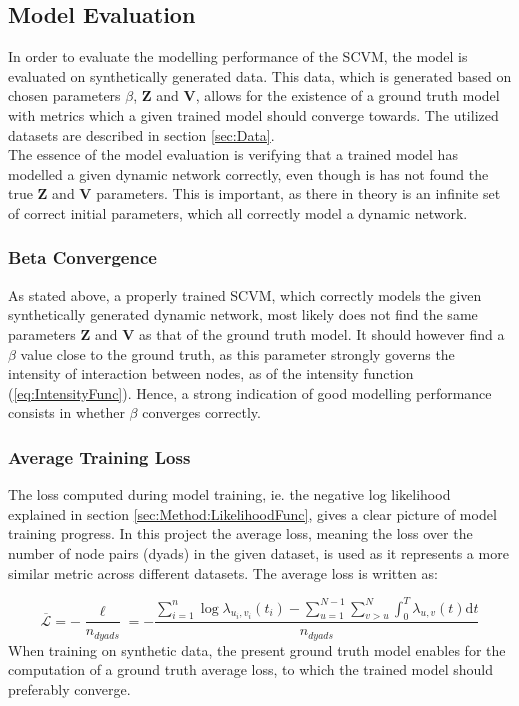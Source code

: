 \subsection{Model Evaluation}
\label{sec:Method:Evaluation}
In order to evaluate the modelling performance of the SCVM, the model is evaluated on synthetically generated data. 
This data, which is generated based on chosen parameters $\beta$, $\textbf{Z}$ and $\textbf{V}$, allows for the existence of a ground truth model with metrics which a given trained model should converge towards. 
The utilized datasets are described in section \ref{sec:Data}.
\\
The essence of the model evaluation is verifying that a trained model has modelled a given dynamic network correctly, even though is has not found the true $\textbf{Z}$ and $\textbf{V}$ parameters.
This is important, as there in theory is an infinite set of correct initial parameters, which all correctly model a dynamic network. 


\subsubsection{Beta Convergence}
\label{sec:Method:Evaluation:BetaConvergence}
As stated above, a properly trained SCVM, which correctly models the given synthetically generated dynamic network, most likely does not find the same parameters $\textbf{Z}$ and $\textbf{V}$ as that of the ground truth model.
It should however find a $\beta$ value close to the ground truth, as this parameter strongly governs the intensity of interaction between nodes, as of the intensity function (\ref{eq:IntensityFunc}).
Hence, a strong indication of good modelling performance consists in whether $\beta$ converges correctly.


\subsubsection{Average Training Loss}
\label{sec:Method:Evaluation:Loss}
The loss computed during model training, ie. the negative log likelihood explained in section \ref{sec:Method:LikelihoodFunc}, gives a clear picture of model training progress.
In this project the average loss, meaning the loss over the number of node pairs (dyads) in the given dataset, is used as it represents a more similar metric across different datasets.
The average loss is written as:

\begin{equation}
   \overline{\mathcal{L}} = - \frac{\ell}{n_{dyads}} = - \frac{\sum_{i=1}^n \log \lambda_{u_i,v_i} (t_i) - \sum_{u=1}^{N-1} \sum_{v > u}^{N} \int_{0}^T \lambda_{u,v}(t) \mathrm{d} t}{n_{dyads}}
    \label{eq:LogLikelihoodFuncExplicit}
\end{equation}
When training on synthetic data, the present ground truth model enables for the computation of a ground truth average loss, to which the trained model should preferably converge.


